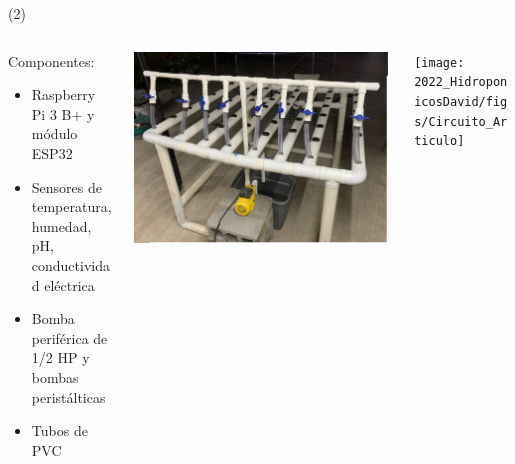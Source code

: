 \begin{frame}{ (2)}
\begin{columns}
\begin{column}{0.35\textwidth}
Componentes:
\begin{itemize}
        \item Raspberry Pi 3 B+ y módulo ESP32
        \item Sensores de temperatura, humedad, pH, conductividad eléctrica
        \item Bomba periférica de 1/2 HP y bombas peristálticas        
        \item Tubos de PVC
	\end{itemize}
\end{column}
\begin{column}{0.35\textwidth}  
\includegraphics[width=0.98\textwidth]{2022_HidroponicosDavid/figs/1}
\end{column}
\begin{column}{0.30\textwidth}  
\texttt{[image: 2022\_HidroponicosDavid/figs/Circuito\_Articulo]}
\end{column}
\end{columns} 
\end{frame}


